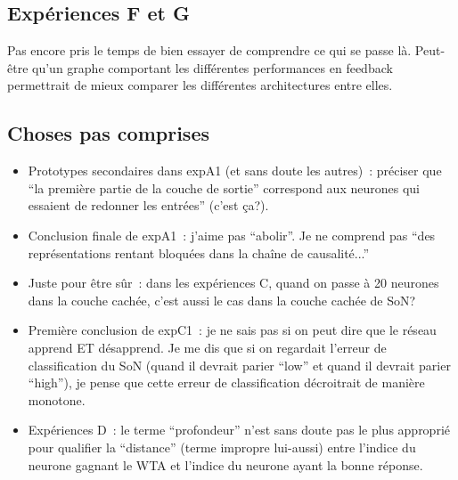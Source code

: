 \subsection{Expériences F et G
\label{sec:expFG}}

Pas encore pris le temps de bien essayer de comprendre ce qui se passe là. Peut-être qu'un graphe comportant les différentes performances en feedback permettrait de mieux comparer les différentes architectures entre elles.

\subsection{Choses pas comprises
\label{sec:strange}}

\begin{itemize}
\item Prototypes secondaires dans expA1 (et sans doute les autres)~: préciser que ``la première partie de la couche de sortie'' correspond aux neurones qui essaient de redonner les entrées'' (c'est ça?).
\item Conclusion finale de expA1~: j'aime pas ``abolir''. Je ne comprend pas ``des représentations rentant bloquées dans la chaîne de causalité...''
\item Juste pour être sûr~: dans les expériences C, quand on passe à 20 neurones dans la couche cachée, c'est aussi le cas dans la couche cachée de SoN?
\item Première conclusion de expC1~: je ne sais pas si on peut dire que le réseau apprend ET désapprend. Je me dis que si on regardait l'erreur de classification du SoN (quand il devrait parier ``low'' et quand il devrait parier ``high''), je pense que cette erreur de classification décroitrait de manière monotone.
\item Expériences D~: le terme ``profondeur'' n'est sans doute pas le plus approprié pour qualifier la ``distance'' (terme impropre lui-aussi) entre l'indice du neurone gagnant le WTA et l'indice du neurone ayant la bonne réponse.
\end{itemize}
